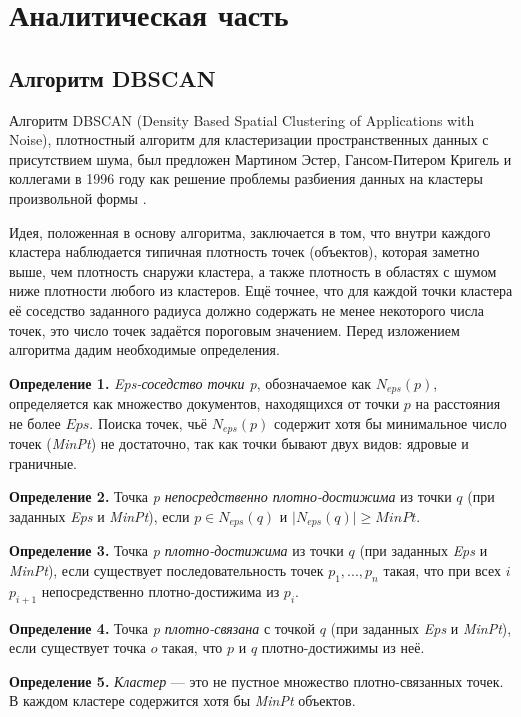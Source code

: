 \chapter{Аналитическая часть}

\section{Алгоритм DBSCAN}
Алгоритм DBSCAN (Density Based Spatial Clustering of Applications with Noise), плотностный алгоритм для кластеризации пространственных данных с присутствием шума, был предложен Мартином Эстер, Гансом-Питером Кригель и коллегами в 1996 году как решение проблемы разбиения данных на кластеры произвольной формы \cite{dbscan}.

Идея, положенная в основу алгоритма, заключается в том, что внутри каждого кластера наблюдается типичная плотность точек (объектов), которая заметно выше, чем плотность снаружи кластера, а также плотность в областях с шумом ниже плотности любого из кластеров. 
Ещё точнее, что для каждой точки кластера её соседство заданного радиуса должно содержать не менее некоторого числа точек, это число точек задаётся пороговым значением.
Перед изложением алгоритма дадим необходимые определения.

\textbf{Определение 1.} \emph{Eps-соседство точки p}, обозначаемое как $N_{eps}(p)$, определяется как множество документов, находящихся от точки $p$ на расстояния не более $Eps$.
Поиска точек, чьё $N_{eps}(p)$ содержит хотя бы минимальное число точек (\emph{MinPt}) не достаточно, так как точки бывают двух видов: ядровые и граничные.

\textbf{Определение 2.} Точка \emph{p непосредственно плотно-достижима} из точки $q$ (при
заданных \emph{Eps} и \emph{MinPt}), если $p \in N_{eps}(q)$ и $\vert N_{eps}(q) \vert \ge MinPt.$

\textbf{Определение 3.} Точка \emph{p плотно-достижима} из точки $q$ (при
заданных \emph{Eps} и \emph{MinPt}), если существует последовательность точек $p_1, ..., p_n$ такая, что при всех $i$ $p_{i+1}$ непосредственно плотно-достижима из $p_i.$

\textbf{Определение 4.} Точка \emph{p плотно-связана} с точкой $q$ (при
заданных \emph{Eps} и \emph{MinPt}), если существует точка $o$ такая, что $p$ и $q$ плотно-достижимы из неё.

\textbf{Определение 5.} \emph{Кластер} --- это не пустное множество плотно-связанных точек. В каждом кластере содержится хотя бы \emph{MinPt} объектов.


